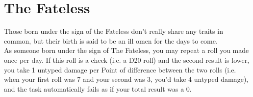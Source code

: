 \section{The Fateless}

Those born under the sign of the Fateless don't really share any traits in common, but their birth is said to be an ill omen for the days to come.\\
As someone born under the sign of The Fateless, you may repeat a roll you made once per day. If this roll is a check (i.e. a D20 roll) and the second result is lower, you take 1 untyped damage per Point of difference between the two rolls (i.e. when your first roll was 7 and your second was 3, you'd take 4 untyped damage), and the task automatically fails as if your total result was a 0.\\